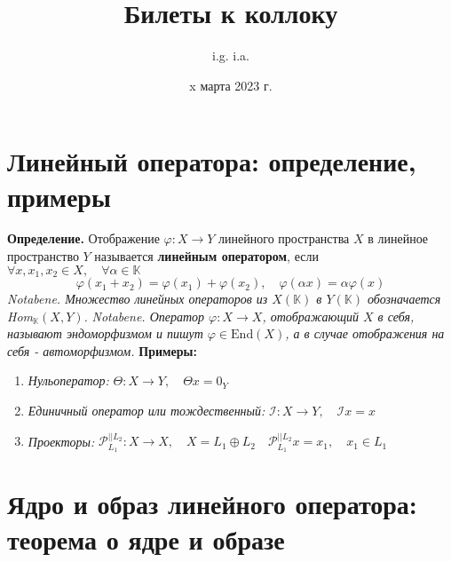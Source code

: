 \documentclass{article}
\title{\textbf{Билеты к коллоку}}
\author{i.g. i.a.}
\date{x марта 2023 г.}
\newcommand*{\notabene}[1]{\textit{Notabene. #1.} \newline}
\newcommand*{\definition}[1]{\textbf{Определение.} #1 \newline}
\newcommand*{\Hom}[2]{Hom$_\mathbb{K}(#1, #2)$}
\begin{document}
\tableofcontents
\maketitle

\section{Линейный оператора: определение, примеры}
\definition{Отображение $\varphi: X \to Y$ линейного пространства $X$ в линейное пространство $Y$ называется \textbf{линейным оператором}, если $\forall x, x_1, x_2 \in X, \quad \forall \alpha \in \mathbb{K}$}
$$
    \varphi(x_1 + x_2) = \varphi(x_1) + \varphi(x_2), \quad \varphi(\alpha x) = \alpha \varphi(x)
$$
\notabene{Множество линейных операторов из $X(\mathbb{K})$ в $Y(\mathbb{K})$ обозначается \Hom{X}{Y}}
\newline
\notabene{Оператор $\varphi: X \to X$, отображающий $X$ в себя, называют \textit{эндоморфизмом} и пишут $\varphi \in \text{End}(X)$, а в случае отображения на себя - \textit{автоморфизмом}}
\newline
\textbf{Примеры:} 
\begin{enumerate}
    \item \textit{Нульоператор: } $\Theta: X \to Y, \quad \Theta x = 0_Y$
    \item \textit{Единичный оператор или тождественный: } $\mathcal I: X \to Y, \quad \mathcal Ix = x$
    \item \textit{Проекторы: } $\mathcal P_{L_1}^{|| L_2}: X \to X, \quad X = L_1 \oplus L_2 \quad \mathcal P_{L_1}^{|| L_2} x = x_1, \quad x_1 \in L_1$
\end{enumerate}
\section{Ядро и образ линейного оператора: теорема о ядре и образе}
\end{document}
